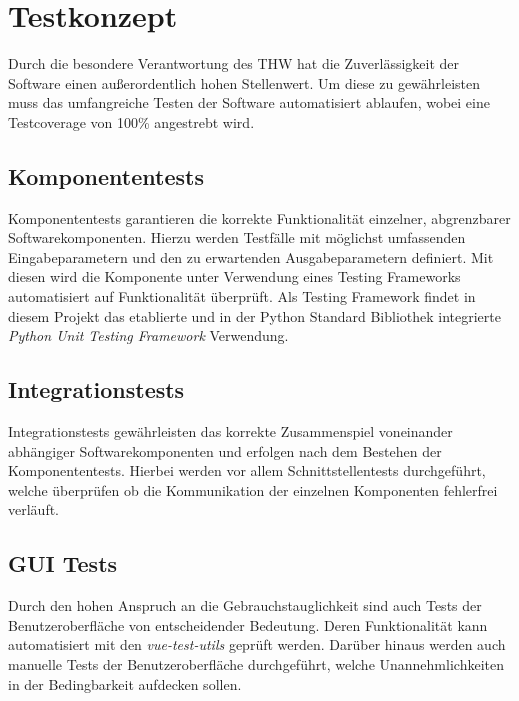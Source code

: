 \section{Testkonzept}
Durch die besondere Verantwortung des THW hat die Zuverlässigkeit der Software einen außerordentlich hohen Stellenwert. Um diese zu gewährleisten muss das umfangreiche Testen der Software automatisiert ablaufen, wobei eine Testcoverage von 100\% angestrebt wird. 
\subsection{Komponententests}
Komponententests garantieren die korrekte Funktionalität einzelner, abgrenzbarer Softwarekomponenten. Hierzu werden Testfälle mit möglichst umfassenden Eingabeparametern und den zu erwartenden Ausgabeparametern definiert. Mit diesen wird die Komponente unter Verwendung eines Testing Frameworks automatisiert auf Funktionalität überprüft. Als Testing Framework findet in diesem Projekt das etablierte und in der Python Standard Bibliothek integrierte \textit{Python Unit Testing Framework} Verwendung.
\subsection{Integrationstests} 
Integrationstests gewährleisten das korrekte Zusammenspiel voneinander abhängiger Softwarekomponenten und erfolgen nach dem Bestehen der Komponententests. Hierbei werden vor allem Schnittstellentests durchgeführt, welche überprüfen ob die Kommunikation der einzelnen Komponenten fehlerfrei verläuft.
\subsection{GUI Tests}
Durch den hohen Anspruch an die Gebrauchstauglichkeit sind auch Tests der Benutzeroberfläche von entscheidender Bedeutung. Deren Funktionalität kann automatisiert mit den \textit{vue-test-utils} geprüft werden. Darüber hinaus werden auch manuelle Tests der Benutzeroberfläche durchgeführt, welche Unannehmlichkeiten in der Bedingbarkeit aufdecken sollen.